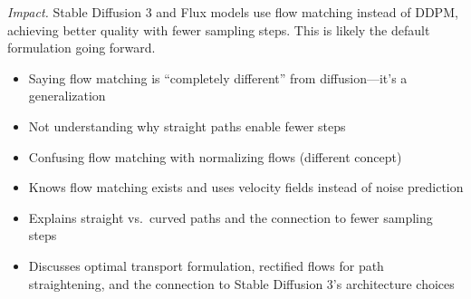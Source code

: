 \begin{interviewq}
\textit{Impact.} Stable Diffusion 3 and Flux models use flow matching instead of DDPM, achieving better quality with fewer sampling steps. This is likely the default formulation going forward.

\redflags
\begin{itemize}
    \item Saying flow matching is ``completely different'' from diffusion---it's a generalization
    \item Not understanding why straight paths enable fewer steps
    \item Confusing flow matching with normalizing flows (different concept)
\end{itemize}


\goodgreat
\begin{itemize}
    \item {} Knows flow matching exists and uses velocity fields instead of noise prediction
    \item {} Explains straight vs.\ curved paths and the connection to fewer sampling steps
    \item {} Discusses optimal transport formulation, rectified flows for path straightening, and the connection to Stable Diffusion 3's architecture choices
\end{itemize}

\end{interviewq}

